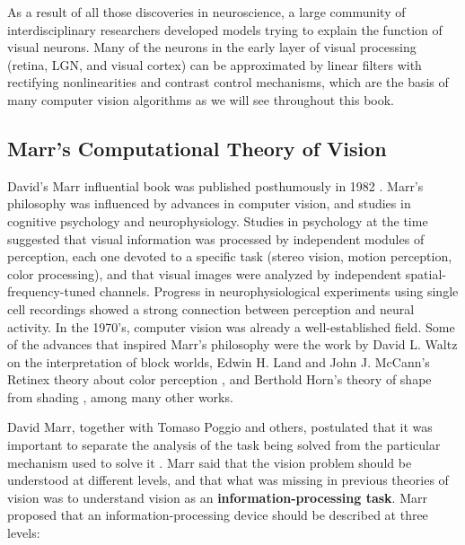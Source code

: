 As a result of all those discoveries in neuroscience, a large community of interdisciplinary researchers developed models trying to explain the function of visual neurons. Many of the neurons in the early layer of visual processing (retina, LGN, and visual cortex) can be approximated by linear filters with rectifying nonlinearities and contrast control mechanisms, which are the basis of many computer vision algorithms as we will see throughout this book. 











\subsection{Marr's Computational Theory of Vision}


David’s Marr influential book  was published posthumously in 1982 \cite{Marr82}. 
Marr’s philosophy was influenced by advances in computer vision, and studies in cognitive psychology and neurophysiology. Studies in psychology at the time suggested that visual information was processed by independent modules of perception, each one devoted to a specific task (stereo vision, motion perception, color processing), and that visual images were analyzed by independent spatial-frequency-tuned channels. Progress in neurophysiological experiments using single cell recordings showed a strong connection between perception and neural activity. In the 1970’s, computer vision was already a well-established field. Some of the advances that inspired Marr's philosophy were the work by David L. Waltz \cite{Waltz1972GeneratingSD} on the interpretation of block worlds, Edwin H. Land and John J. McCann’s Retinex theory about color perception \cite{Land1971}, and Berthold Horn’s theory of shape from shading \cite{Horn1977}, among many other works.

David Marr, together with Tomaso Poggio and others, postulated that it was important to separate the analysis of the task being solved from the particular mechanism used to solve it \cite{Marr82}. Marr said that the vision problem should be understood at different levels, and that what was missing in previous theories of vision was to understand vision as an {\bf information-processing task}. Marr proposed that an information-processing device should be described at three levels:

